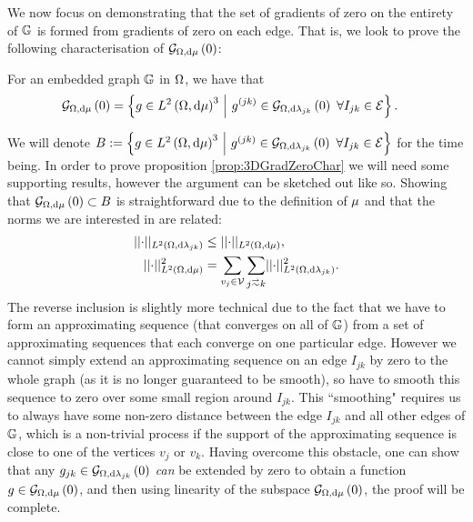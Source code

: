 We now focus on demonstrating that the set of gradients of zero on the entirety of $\mathbb{G}$ is formed from gradients of zero on each edge.
That is, we look to prove the following characterisation of $\mathcal{G}_{ \Omega, \mathrm{d}\mu}\left( 0 \right)$:
\begin{prop} \label{prop:3DGradZeroChar}
	For an embedded graph $\mathbb{G}$ in $\Omega$, we have that
	\begin{align*}
		\mathcal{G}_{ \Omega, \mathrm{d}\mu}\left( 0 \right) &= \left\{  g\in L^{2}\left( \Omega,\mathrm{d}\mu \right)^3 \ \middle\vert \  g^{(jk)}\in\mathcal{G}_{ \Omega, \mathrm{d}\lambda_{jk}}\left( 0 \right) \ \forall I_{jk}\in\mathcal{E}  \right\}.
	\end{align*}
\end{prop}
We will denote $B := \left\{  g\in L^{2}\left( \Omega,\mathrm{d}\mu \right)^3 \ \middle\vert \  g^{(jk)}\in\mathcal{G}_{ \Omega, \mathrm{d}\lambda_{jk}}\left( 0 \right) \ \forall I_{jk}\in\mathcal{E}  \right\}$ for the time being.
In order to prove proposition \ref{prop:3DGradZeroChar} we will need some supporting results, however the argument can be sketched out like so.
Showing that $\mathcal{G}_{ \Omega, \mathrm{d}\mu}\left( 0 \right)\subset B$ is straightforward due to the definition of $\mu$ and that the norms we are interested in are related:
\begin{align*}
	\norm{\cdot}_{\ltwo{\ddom}{\lambda_{jk}}} &\leq \norm{\cdot}_{\ltwo{\ddom}{\ddmes}}, \\
	\norm{\cdot}_{\ltwo{\ddom}{\ddmes}}^2 &= \sum_{v_j\in\vertSet}\sum_{j\conLeft k}\norm{\cdot}_{\ltwo{\ddom}{\lambda_{jk}}}^2.
\end{align*}
The reverse inclusion is slightly more technical due to the fact that we have to form an approximating sequence (that converges on all of $\mathbb{G}$) from a set of approximating sequences that each converge on one particular edge.
However we cannot simply extend an approximating sequence on an edge $I_{jk}$ by zero to the whole graph (as it is no longer guaranteed to be smooth), so have to smooth this sequence to zero over some small region around $I_{jk}$.
This ``smoothing" requires us to always have some non-zero distance between the edge $I_{jk}$ and all other edges of $\mathbb{G}$, which is a non-trivial process if the support of the approximating sequence is close to one of the vertices $v_j$ or $v_k$.
Having overcome this obstacle, one can show that any $g_{jk}\in\mathcal{G}_{ \Omega, \mathrm{d}\lambda_{jk}}\left( 0 \right)$ \emph{can} be extended by zero to obtain a function $g\in\mathcal{G}_{ \Omega, \mathrm{d}\mu}\left( 0 \right)$, and then using linearity of the subspace $\mathcal{G}_{ \Omega, \mathrm{d}\mu}\left( 0 \right)$, the proof will be complete.


